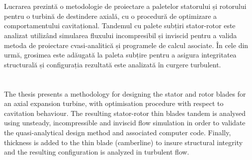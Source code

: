 \chapter{\abstractname}

\makeatletter
{}
{\renewcommand{\abstractname}{Rezumat}}
{\renewcommand{\abstractname}{Rezumat în limba engleză}}
Lucrarea prezintă o metodologie de proiectare a paletelor statorului și rotorului pentru o turbină de destindere axială, cu o procedură de optimizare a comportamentului cavitațional.
Tandemul cu palete subțiri stator-rotor este analizat utilizând simularea fluxului incompresibil și inviscid pentru a valida metoda de proiectare cvasi-analitică și programele de calcul asociate. În cele din urmă, grosimea este adăugată la paleta subțire pentru a asigura integritatea structurală și configurația rezultată este analizată în curgere turbulent.

\makeatother

\chapter{\abstractname}

\makeatletter
{}
{\renewcommand{\abstractname}{Rezumat în limba engleză}}
{\renewcommand{\abstractname}{Rezumat}}

The thesis presents a methodology for designing the stator and rotor blades for an axial expansion turbine, with optimisation procedure with respect to cavitation behaviour.
The resulting stator-rotor thin blades tandem is analysed using unsteady, incompressible and inviscid flow simulation in order to validate the quasi-analytical design method and associated computer code. Finally, thickness is added to  the thin blade (camberline) to insure structural integrity and the resulting configuration is analyzed in turbulent flow.

\makeatother